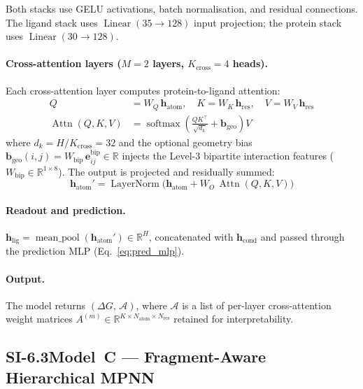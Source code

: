 \documentclass[11pt]{article}
\begin{document}
Both stacks use GELU activations, batch normalisation, and residual connections.
The ligand stack uses $\operatorname{Linear}(35 \to 128)$ input projection; the
protein stack uses $\operatorname{Linear}(30 \to 128)$.

\paragraph{Cross-attention layers ($M = 2$ layers, $K_{\mathrm{cross}} = 4$ heads).}
Each cross-attention layer computes protein-to-ligand attention:
\begin{align}
  Q &= W_Q\, \mathbf{h}_{\mathrm{atom}}, \quad
  K = W_K\, \mathbf{h}_{\mathrm{res}}, \quad
  V = W_V\, \mathbf{h}_{\mathrm{res}} \\[4pt]
  \operatorname{Attn}(Q, K, V) &= \operatorname{softmax}\!\left(
    \frac{Q K^\top}{\sqrt{d_k}} + \mathbf{b}_{\mathrm{geo}}
  \right) V \label{eq:cross_attn}
\end{align}
where $d_k = H / K_{\mathrm{cross}} = 32$ and the optional geometry bias
$\mathbf{b}_{\mathrm{geo}}(i, j) = W_{\mathrm{bip}}\,
\mathbf{e}_{ij}^{\mathrm{bip}} \in \mathbb{R}$
injects the Level-3 bipartite interaction features
($W_{\mathrm{bip}} \in \mathbb{R}^{1 \times 8}$).
The output is projected and residually summed:
\begin{equation}
  \mathbf{h}_{\mathrm{atom}}' = \operatorname{LayerNorm}\!\bigl(
    \mathbf{h}_{\mathrm{atom}} + W_O\, \operatorname{Attn}(Q, K, V)
  \bigr)
\end{equation}

\paragraph{Readout and prediction.}
$\mathbf{h}_{\mathrm{lig}} = \operatorname{mean\_pool}(\mathbf{h}_{\mathrm{atom}}')
\in \mathbb{R}^{H}$, concatenated with $\mathbf{h}_{\mathrm{cond}}$ and
passed through the prediction MLP (Eq.~\ref{eq:pred_mlp}).

\paragraph{Output.}
The model returns $(\Delta G,\, \mathcal{A})$, where $\mathcal{A}$ is a list
of per-layer cross-attention weight matrices
$A^{(m)} \in \mathbb{R}^{K \times N_{\mathrm{atom}} \times N_{\mathrm{res}}}$
retained for interpretability.

\subsection*{SI-6.3\quad Model~C --- Fragment-Aware Hierarchical MPNN}
\label{si:model_c}
\end{document}
